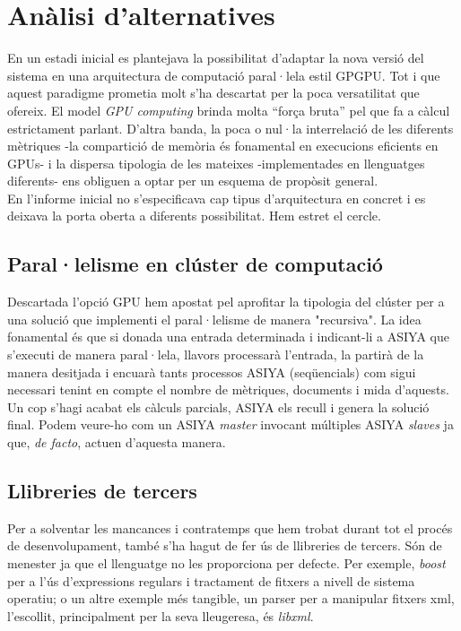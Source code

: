 \documentclass[11pt,a4paper]{article}
\begin{document}
\section{Anàlisi d'alternatives}
En un estadi inicial es plantejava la possibilitat d’adaptar la nova versió del sistema en una arquitectura de computació paral·lela estil GPGPU\cite{cuda}. Tot i que aquest paradigme prometia molt s’ha descartat per la poca versatilitat que ofereix. El model \textit{GPU computing} brinda molta “força bruta” pel que fa a càlcul estrictament parlant. D’altra banda, la poca o nul·la interrelació de les diferents mètriques -la compartició de memòria és fonamental en execucions eficients en GPUs- i la dispersa tipologia de les mateixes -implementades en llenguatges diferents- ens obliguen a optar per un esquema de propòsit general. 
\\

En l’informe inicial no s’especificava cap tipus d’arquitectura en concret i es deixava la porta oberta a diferents possibilitat. Hem estret el cercle.

\subsection{Paral·lelisme en clúster de computació}

Descartada l’opció GPU hem apostat pel aprofitar la tipologia del clúster per a una solució que implementi el paral·lelisme de manera "recursiva".  La idea fonamental és que si donada una entrada determinada i indicant-li a ASIYA que s’executi de manera paral·lela, llavors processarà l’entrada, la partirà de la manera desitjada i encuarà tants processos ASIYA (seqüencials) com sigui necessari tenint en compte el nombre de mètriques, documents i mida d'aquests. Un cop s’hagi acabat els càlculs parcials, ASIYA els recull i genera la solució final. Podem veure-ho com un ASIYA \emph{master} invocant múltiples ASIYA \emph{slaves} ja que, \textit{de facto}, actuen d’aquesta manera.

\subsection{Llibreries de tercers}
Per a solventar les mancances i contratemps que hem trobat durant tot el procés de desenvolupament, també s'ha hagut de fer ús de llibreries de tercers. Són de menester ja que el llenguatge no les proporciona per defecte. Per exemple, \textit{boost}\cite{boost} per a l'ús d'expressions regulars i tractament de fitxers a nivell de sistema operatiu; o un altre exemple més tangible, un parser per a manipular fitxers xml, l'escollit, principalment per la seva lleugeresa, és \textit{libxml}\cite{libxml}.
\end{document}

